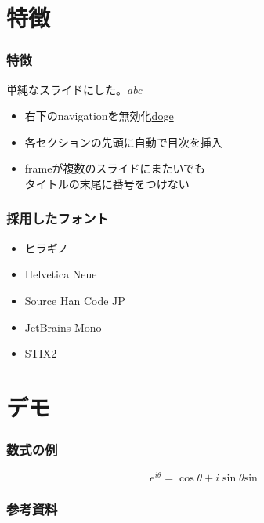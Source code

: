 \documentclass[unicode, 14pt, aspectratio=169]{beamer}
\begin{document}
\section{特徴}
\begin{frame}[t]
  \frametitle{特徴}
    単純なスライドにした。\textit{abc}
  \vspace{0.2\paperheight}
  \begin{itemize}
    \item 右下のnavigationを無効化\href{https://google.com}{doge}
    \item 各セクションの先頭に自動で目次を挿入
    \item frameが複数のスライドにまたいでも\\タイトルの末尾に番号をつけない
  \end{itemize}
\end{frame}


\begin{frame}
\frametitle{採用したフォント}
\begin{itemize}
\item ヒラギノ
\item Helvetica Neue
\item Source Han Code JP
\item JetBrains Mono
\item STIX2
\end{itemize}
\end{frame}

\section{デモ}

\begin{frame}
  \frametitle{数式の例}
  \begin{equation}
    e^{i\theta} = \cos\theta + i\sin \theta \mathrm{sin}
  \end{equation}
\end{frame}



\begin{frame}[allowframebreaks]
  \frametitle{参考資料}
  \printbibliography
  \nocite{*} 
\end{frame}
\end{document}
